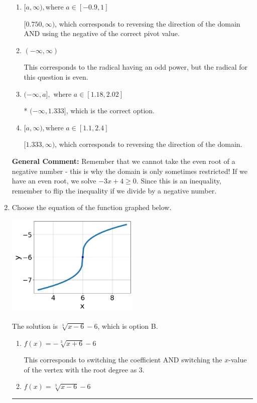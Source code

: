 \documentclass{extbook}[14pt]
\newcommand{\litem}[1]{\item #1

\rule{\textwidth}{0.4pt}}
\begin{document}
\begin{enumerate}
{\begin{enumerate}[label=\Alph*.]
$(-\infty, 0.750]$, which corresponds to using the negative of the correct pivot value.
\item \( [a, \infty), \text{where } a \in [-0.9, 1] \)

$[0.750, \infty)$, which corresponds to reversing the direction of the domain AND using the negative of the correct pivot value.
\item \( (-\infty, \infty) \)

This corresponds to the radical having an odd power, but the radical for this question is even.
\item \( (-\infty, a], \text{ where } a \in [1.18, 2.02] \)

* $(-\infty, 1.333]$, which is the correct option.
\item \( [a, \infty), \text{where } a \in [1.1, 2.4] \)

 $[1.333, \infty)$, which corresponds to reversing the direction of the domain.
\end{enumerate}

\textbf{General Comment:} Remember that we cannot take the even root of a negative number - this is why the domain is only sometimes restricted! If we have an even root, we solve $-3 x + 4 \geq 0$. Since this is an inequality, remember to flip the inequality if we divide by a negative number.
}
\litem{
Choose the equation of the function graphed below.

\begin{center}
    \includegraphics[width=0.5\textwidth]{../Figures/radicalGraphToEquationC.png}
\end{center}


The solution is \( \sqrt[3]{x - 6} - 6 \), which is option B.\begin{enumerate}[label=\Alph*.]
\item \( f(x) = - \sqrt[3]{x + 6} - 6 \)

This corresponds to switching the coefficient AND switching the $x$-value of the vertex with the root degree as $3$.
\item \( f(x) = \sqrt[3]{x - 6} - 6 \)


\end{enumerate}}
\end{enumerate}
\end{document}
